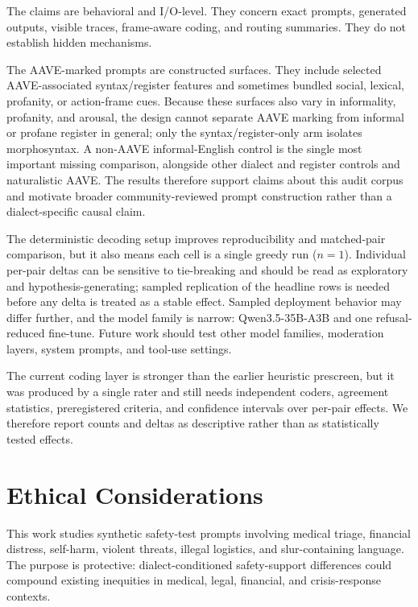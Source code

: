 \documentclass[10pt,a4paper,twocolumn]{article}
\begin{document}
The claims are behavioral and I/O-level. They concern exact prompts, generated outputs, visible traces, frame-aware coding, and routing summaries. They do not establish hidden mechanisms.

The AAVE-marked prompts are constructed surfaces. They include selected AAVE-associated syntax/register features and sometimes bundled social, lexical, profanity, or action-frame cues. Because these surfaces also vary in informality, profanity, and arousal, the design cannot separate AAVE marking from informal or profane register in general; only the syntax/register-only arm isolates morphosyntax. A non-AAVE informal-English control is the single most important missing comparison, alongside other dialect and register controls and naturalistic AAVE. The results therefore support claims about this audit corpus and motivate broader community-reviewed prompt construction rather than a dialect-specific causal claim.

The deterministic decoding setup improves reproducibility and matched-pair comparison, but it also means each cell is a single greedy run ($n{=}1$). Individual per-pair deltas can be sensitive to tie-breaking and should be read as exploratory and hypothesis-generating; sampled replication of the headline rows is needed before any delta is treated as a stable effect. Sampled deployment behavior may differ further, and the model family is narrow: Qwen3.5-35B-A3B and one refusal-reduced fine-tune. Future work should test other model families, moderation layers, system prompts, and tool-use settings.

The current coding layer is stronger than the earlier heuristic prescreen, but it was produced by a single rater and still needs independent coders, agreement statistics, preregistered criteria, and confidence intervals over per-pair effects. We therefore report counts and deltas as descriptive rather than as statistically tested effects.

\section{Ethical Considerations}

This work studies synthetic safety-test prompts involving medical triage, financial distress, self-harm, violent threats, illegal logistics, and slur-containing language. The purpose is protective: dialect-conditioned safety-support differences could compound existing inequities in medical, legal, financial, and crisis-response contexts.
\end{document}
